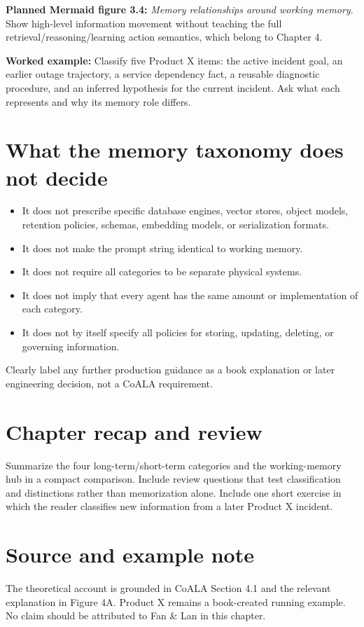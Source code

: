 \textbf{Planned Mermaid figure 3.4:} \emph{Memory relationships around working memory}. Show high-level information movement without teaching the full retrieval/reasoning/learning action semantics, which belong to Chapter 4.

\textbf{Worked example:} Classify five Product X items: the active incident goal, an earlier outage trajectory, a service dependency fact, a reusable diagnostic procedure, and an inferred hypothesis for the current incident. Ask what each represents and why its memory role differs.

\section{What the memory taxonomy does not decide}
\begin{itemize}
  \item It does not prescribe specific database engines, vector stores, object models, retention policies, schemas, embedding models, or serialization formats.
  \item It does not make the prompt string identical to working memory.
  \item It does not require all categories to be separate physical systems.
  \item It does not imply that every agent has the same amount or implementation of each category.
  \item It does not by itself specify all policies for storing, updating, deleting, or governing information.
\end{itemize}

Clearly label any further production guidance as a book explanation or later engineering decision, not a CoALA requirement.

\section{Chapter recap and review}
Summarize the four long-term/short-term categories and the working-memory hub in a compact comparison. Include review questions that test classification and distinctions rather than memorization alone. Include one short exercise in which the reader classifies new information from a later Product X incident.

\section*{Source and example note}
The theoretical account is grounded in CoALA Section 4.1 and the relevant explanation in Figure 4A. Product X remains a book-created running example. No claim should be attributed to Fan \& Lan in this chapter. 


